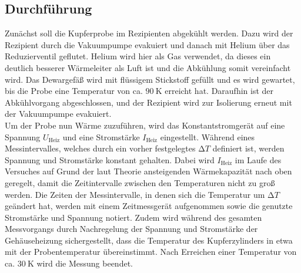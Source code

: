 \subsection{Durchführung}
\label{sec:durchführung}

Zunächst soll die Kupferprobe im Rezipienten abgekühlt werden.
Dazu wird der Rezipient durch die Vakuumpumpe evakuiert und danach mit Helium über das Reduzierventil geflutet.
Helium wird hier als Gas verwendet, da dieses ein deutlich besserer Wärmeleiter als Luft ist und die Abkühlung somit vereinfacht wird.
Das Dewargefäß wird mit flüssigem Stickstoff gefüllt und es wird gewartet, bis die Probe eine Temperatur von ca. $\SI{90}{\kelvin}$ erreicht hat.
Daraufhin ist der Abkühlvorgang abgeschlossen, und der Rezipient wird zur Isolierung erneut mit der Vakuumpumpe evakuiert.\\

Um der Probe nun Wärme zuzuführen, wird das Konstantstromgerät auf eine Spannung $U_{\text{Heiz}}$ und eine Stromstärke $I_{\text{Heiz}}$ eingestellt.
Während eines Messintervalles, welches durch ein vorher festgelegtes $\increment T$ definiert ist, werden Spannung und Stromstärke konstant gehalten.
Dabei wird $I_{\text{Heiz}}$ im Laufe des Versuches auf Grund der laut Theorie ansteigenden Wärmekapazität nach oben geregelt, damit die Zeitintervalle zwischen den Temperaturen nicht zu groß werden.
Die Zeiten der Messintervalle, in denen sich die Temperatur um $\increment T$ geändert hat, werden mit einem Zeitmessgerät aufgenommen sowie die genutzte Stromstärke und Spannung notiert.
Zudem wird während des gesamten Messvorgangs durch Nachregelung der Spannung und Stromstärke der Gehäuseheizung sichergestellt, dass die Temperatur des Kupferzylinders in etwa mit der Probentemperatur übereinstimmt.
Nach Erreichen einer Temperatur von ca. $\SI{30}{\kelvin}$ wird die Messung beendet.
